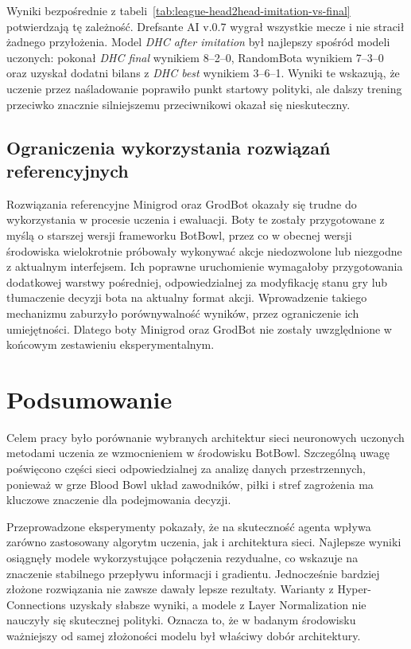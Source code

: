 Wyniki bezpośrednie z tabeli~\ref{tab:league-head2head-imitation-vs-final} potwierdzają tę zależność. Drefsante AI v.0.7 wygrał wszystkie mecze i nie stracił żadnego przyłożenia. Model \textit{DHC after imitation} był najlepszy spośród modeli uczonych: pokonał \textit{DHC final} wynikiem 8--2--0, RandomBota wynikiem 7--3--0 oraz uzyskał dodatni bilans z \textit{DHC best} wynikiem 3--6--1. Wyniki te wskazują, że uczenie przez naśladowanie poprawiło punkt startowy polityki, ale dalszy trening przeciwko znacznie silniejszemu przeciwnikowi okazał się nieskuteczny.

\section{Ograniczenia wykorzystania rozwiązań referencyjnych}

Rozwiązania referencyjne Minigrod oraz GrodBot okazały się trudne do wykorzystania w procesie uczenia i ewaluacji. Boty te zostały przygotowane z myślą o starszej wersji frameworku BotBowl, przez co w obecnej wersji środowiska wielokrotnie próbowały wykonywać akcje niedozwolone lub niezgodne z aktualnym interfejsem. Ich poprawne uruchomienie wymagałoby przygotowania dodatkowej warstwy pośredniej, odpowiedzialnej za modyfikację stanu gry lub tłumaczenie decyzji bota na aktualny format akcji. Wprowadzenie takiego mechanizmu zaburzyło porównywalność wyników, przez ograniczenie ich umiejętności. Dlatego boty Minigrod oraz GrodBot nie zostały uwzględnione w końcowym zestawieniu eksperymentalnym.

\chapter{Podsumowanie}

Celem pracy było porównanie wybranych architektur sieci neuronowych uczonych metodami uczenia ze wzmocnieniem w środowisku BotBowl. Szczególną uwagę poświęcono części sieci odpowiedzialnej za analizę danych przestrzennych, ponieważ w grze Blood Bowl układ zawodników, piłki i stref zagrożenia ma kluczowe znaczenie dla podejmowania decyzji.

Przeprowadzone eksperymenty pokazały, że na skuteczność agenta wpływa zarówno zastosowany algorytm uczenia, jak i architektura sieci. Najlepsze wyniki osiągnęły modele wykorzystujące połączenia rezydualne, co wskazuje na znaczenie stabilnego przepływu informacji i gradientu. Jednocześnie bardziej złożone rozwiązania nie zawsze dawały lepsze rezultaty. Warianty z Hyper-Connections uzyskały słabsze wyniki, a modele z Layer Normalization nie nauczyły się skutecznej polityki. Oznacza to, że w badanym środowisku ważniejszy od samej złożoności modelu był właściwy dobór architektury.

